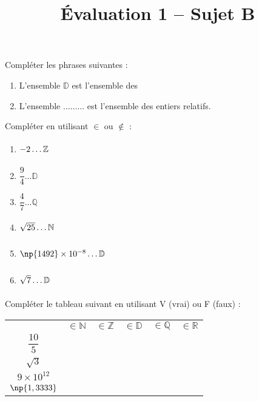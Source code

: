 \documentclass[a4paper,dvipsnames]{article}
\begin{document}
\title{Évaluation 1 -- Sujet B}

\pagestyle{empty}

\date{}
\author{}

\maketitle{}

\exo[2 points] 
Compléter les phrases suivantes :
\begin{enumerate}
  \item L'ensemble $\mathbb{D}$ est l'ensemble des \dotfill
  \item L'ensemble $\hdots\hdots\hdots$ est l'ensemble des entiers relatifs.
\end{enumerate}

\bigskip

\exo[3 points]
Compléter en utilisant $\in$ ou $\notin$ :
\begin{multicols}{3}
  \begin{enumerate}
    \item $-2\hdots\mathbb{Z}\vphantom{\dfrac{1}{3}}$
    \item $\dfrac{9}{4}\hdots\mathbb{D}$
    \item $\dfrac{4}{7}\hdots\mathbb{Q}$
    \item $\sqrt{25}\hdots\mathbb{N}\vphantom{\dfrac{9}{4}}$
    \item $\np{1492}\times10^{-8}\hdots\mathbb{D}\vphantom{\dfrac{1}{3}}$
    \item $\sqrt{7}\hdots\mathbb{D}\vphantom{\dfrac{1}{3}}$
  \end{enumerate}
\end{multicols}

\bigskip

\exo[2 points]
Compléter le tableau suivant en utilisant V (vrai) ou F (faux) :
\begin{center}
  \begin{tabular}{@{}cccccc@{}}
    \toprule
    & $\in\mathbb{N}$ & $\in\mathbb{Z}$ & $\in\mathbb{D}$ & $\in\mathbb{Q}$ & $\in\mathbb{R}$\\
    \cmidrule(lr){2-6}
    $\dfrac{10}{5}$ & & & & & \\ 
    \addlinespace[2mm]
    $\sqrt{3}$ & & & & & \\
    \addlinespace[1mm]
    $9\times10^{12}$ & & & & & \\
    \addlinespace[1mm]
    $\np{1,3333}$ & & & & & \\
    \bottomrule
  \end{tabular}
\end{center}
\end{document}
